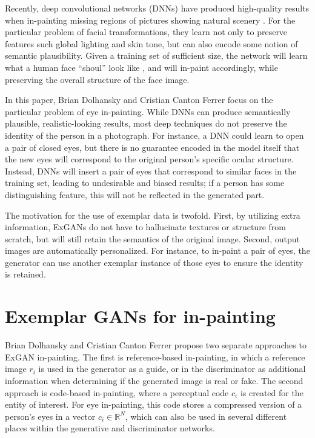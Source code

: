 \documentclass[10pt,twocolumn,letterpaper]{article}
\begin{document}
Recently, deep convolutional networks (DNNs) have produced high-quality results when in-painting missing regions of pictures showing natural scenery \cite{Ishikawa2017Globally}. For the particular problem of facial transformations, they learn not only to preserve features such global lighting and skin tone, but can also encode some notion of semantic plausibility. Given a training set of sufficient size, the network will learn what a human face ``shoul'' look like \cite{Karras2017Progressive}, and will in-paint accordingly, while preserving the overall structure of the face image.

In this paper, Brian Dolhansky and Cristian Canton Ferrer focus on the particular problem of eye in-painting. While DNNs can produce semantically plausible, realistic-looking results, most deep techniques do not preserve the identity of the person in a photograph. For instance, a DNN could learn to open a pair of closed eyes, but there is no guarantee encoded in the model itself that the new eyes will correspond to the original person's specific ocular structure. Instead, DNNs will insert a pair of eyes that correspond to similar faces in the training set, leading to undesirable and biased results; if a person has some distinguishing feature, this will not be reflected in the generated part.

The motivation for the use of exemplar data is twofold. First, by utilizing extra information, ExGANs do not have to hallucinate textures or structure from scratch, but will still retain the semantics of the original image. Second, output images are automatically personalized. For instance, to in-paint a pair of eyes, the generator can use another exemplar instance of those eyes to ensure the identity is retained.

\section{Exemplar GANs for in-painting}

Brian Dolhansky and Cristian Canton Ferrer propose two separate approaches to ExGAN in-painting. The first is reference-based in-painting, in which a reference image $r_i$ is used in the generator as a guide, or in the discriminator as additional information when determining if the generated image is real or fake. The second approach is code-based in-painting, where a perceptual code $c_i$ is created for the entity of interest. For eye in-painting, this code stores a compressed version of a person's eyes in a vector $c_i\in \mathbb{R}^N$, which can also be used in several different places within the generative and discriminator networks.
\end{document}
